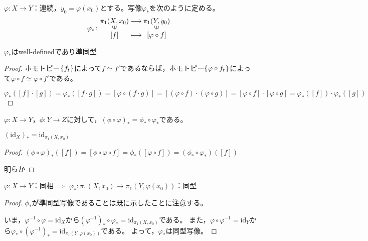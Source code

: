\documentclass[uplatex]{jsarticle}
\begin{document}
\begin{teigi}
  $\varphi \colon X \longrightarrow Y$：連続，$y_{0} = \varphi(x_{0})$とする。写像$\varphi_{*}$を次のように定める。
  \begin{equation}
    \varphi_{*} \colon \mapdef{\pi_{1}(X,x_{0})}{\pi_{1}(Y,y_{0})}{\left[ f \right]}{\left[ \varphi \circ f \right]}
  \end{equation}
\end{teigi}

\begin{hodai}
  $\varphi_{*}$はwell-definedであり準同型
\end{hodai}

\begin{proof}

  ホモトピー$\Set{\hspace{-1.8pt} f_{t} \hspace{-1.8pt}}$によって$f \simeq f'$であるならば，ホモトピー$\Set{\hspace{-1.8pt} \varphi \circ f_{t} \hspace{-1.8pt}}$によって$\varphi \circ f \simeq \varphi \circ f'$である。

  \sukima {}
  \begin{equation}
    \varphi_{*} ([f] \cdot [g]) = \varphi_{*} ([f \cdot g]) = [ \varphi \circ (f \cdot g)] = [(\varphi \circ f) \cdot (\varphi \circ g)] = [\varphi \circ f] \cdot [\varphi \circ g] = \varphi_{*}([f]) \cdot \varphi_{*} ([g])
  \end{equation}
\end{proof}

\begin{hodai}
   $\varphi \colon X \longrightarrow Y$，$\phi \colon Y \longrightarrow Z$に対して，$(\phi \circ \varphi)_{*} = \phi_{*} \circ \varphi_{*}$である。

   $(\mathrm{id}_{X})_{*} = \mathrm{id}_{\pi_{1}(X,x_{0})}$
\end{hodai}

\begin{proof}
   $(\phi \circ \varphi)_{*}([f]) = [\phi \circ \varphi \circ f] = \phi_{*}([\varphi \circ f]) = (\phi_{*} \circ \varphi_{*}) ([f])$

   明らか
\end{proof}

\begin{teiri}
  $\varphi \colon X \longrightarrow Y$：同相 $\Longrightarrow$ $\varphi_{*} \colon \pi_{1} (X, x_{0}) \longrightarrow \pi_{1} (Y, \varphi (x_{0}))$：同型
\end{teiri}

\begin{proof}
  $\phi_{*}$が準同型写像であることは既に示したことに注意する。

  いま，$\varphi^{-1} \circ \varphi = \mathrm{id}_{X}$から$(\varphi^{-1})_{*} \circ \varphi_{*} = \mathrm{id}_{\pi_{1}(X,x_{0})}$である。
  また，$\varphi \circ \varphi^{-1} = \mathrm{id}_{Y}$から$\varphi_{*} \circ (\varphi^{-1})_{*} = \mathrm{id}_{\pi_{1}(Y,\varphi(x_{0}))}$である。
  よって，$\varphi_{*}$は同型写像。
\end{proof}
\end{document}
